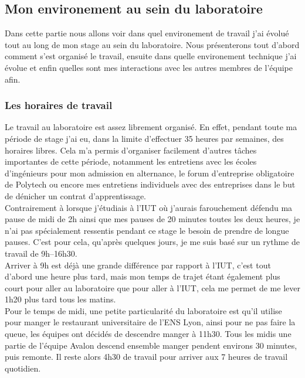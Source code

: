 \subsection{Mon environement au sein du laboratoire}
Dans cette partie nous allons voir dans quel environement de travail j'ai évolué tout au long de mon stage au sein du laboratoire. Nous présenterons tout d'abord comment s'est organisé le travail, ensuite dans quelle environement technique j'ai évolue et enfin quelles sont mes interactions avec les autres membres de l'équipe afin.

\subsubsection{Les horaires de travail}
Le travail au laboratoire est assez librement organisé. En effet, pendant toute ma période de stage j'ai eu, dans la limite d'effectuer 35 heures par semaines, des horaires libres. Cela m'a permis d'organiser facilement d'autres tâches importantes de cette période, notamment les entretiens avec les écoles d'ingénieurs pour mon admission en alternance, le forum d'entreprise obligatoire de Polytech ou encore mes entretiens individuels avec des entreprises dans le but de dénicher un contrat d'apprentissage.\\

Contrairement à lorsque j'étudiais à l'IUT où j'aurais farouchement défendu ma pause de midi de 2h ainsi que mes pauses de 20 minutes toutes les deux heures, je n'ai pas spécialement ressentis pendant ce stage le besoin de prendre de longue pauses. C'est pour cela, qu'après quelques jours, je me suis basé sur un rythme de travail de 9h--16h30.\\

Arriver à 9h est déjà une grande différence par rapport à l'IUT, c'est tout d'abord une heure plus tard, mais mon temps de trajet étant également plus court pour aller au laboratoire que pour aller à l'IUT, cela me permet de me lever 1h20 plus tard tous les matins.\\

Pour le temps de midi, une petite particularité du laboratoire est qu'il utilise pour manger le restaurant universitaire de l'ENS Lyon, ainsi pour ne pas faire la queue, les équipes ont décidés de descendre manger à 11h30. Tous les midis une partie de l'équipe Avalon descend ensemble manger pendent environs 30 minutes, puis remonte. Il reste alors 4h30 de travail pour arriver aux 7 heures de travail quotidien.\\

